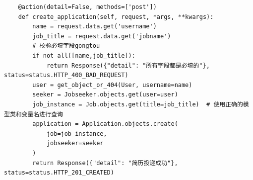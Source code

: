 \documentclass[UTF8,a4paper,10pt]{ctexart}
\begin{document}
\begin{enumerate}
\begin{lstlisting}
    @action(detail=False, methods=['post'])
    def create_application(self, request, *args, **kwargs):
        name = request.data.get('username')
        job_title = request.data.get('jobname')
        # 校验必填字段gongtou
        if not all([name,job_title]):
            return Response({"detail": "所有字段都是必填的"}, status=status.HTTP_400_BAD_REQUEST)
        user = get_object_or_404(User, username=name)
        seeker = Jobseeker.objects.get(user=user)
        job_instance = Job.objects.get(title=job_title)  # 使用正确的模型类和变量名进行查询
        application = Application.objects.create(
            job=job_instance,
            jobseeker=seeker
        )
        return Response({"detail": "简历投递成功"}, status=status.HTTP_201_CREATED)
    \end{lstlisting}
\end{enumerate}
\end{document}

